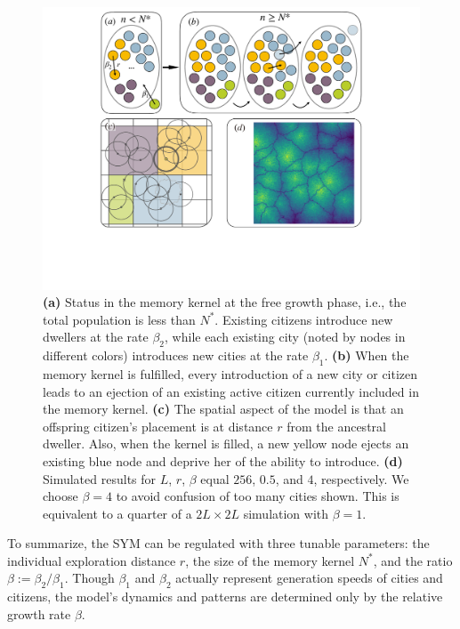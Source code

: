 \documentclass[reprint,unsortedaddress,amsmath,amssymb,aps,prl,showkeys]{revtex4-2}
\begin{document}
\begin{figure}
	\centering
	\includegraphics[width = 0.95\linewidth]{pics/sketchgood.pdf}
	\caption{\textbf{(a)} Status in the memory kernel at the free growth phase, i.e., the total population is less than $N^*$. Existing citizens introduce new dwellers at the rate $\beta_2$, while each existing city (noted by nodes in different colors) introduces new cities at the rate $\beta_1$. \textbf{(b)} When the memory kernel is fulfilled, every introduction of a new city or citizen leads to an ejection of an existing active citizen currently included in the memory kernel. \textbf{(c)} The spatial aspect of the model is that an offspring citizen's placement is at distance $r$ from the ancestral dweller. Also, when the kernel is filled, a new yellow node ejects an existing blue node and deprive her of the ability to introduce. \textbf{(d)} Simulated results for $L$, $r$, $\beta$ equal $256$, $0.5$, and $4$, respectively. We choose $\beta = 4$ to avoid confusion of too many cities shown. This is equivalent to a quarter of a $2L\times 2L$ simulation with $\beta = 1$.}
	\label{sketchpic}
\end{figure}

To summarize, the SYM can be regulated with three tunable parameters: the individual exploration distance $r$, the size of the memory kernel $N^*$, and the ratio $\beta:=\beta_2/\beta_1$. Though $\beta_1$ and $\beta_2$ actually represent generation speeds of cities and citizens, the model's dynamics and patterns are determined only by the relative growth rate $\beta$.
\end{document}
